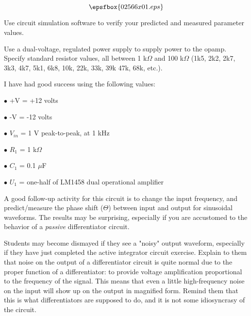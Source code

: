 

$$\epsfbox{02566x01.eps}$$

\vfil \eject






Use circuit simulation software to verify your predicted and measured parameter values.







Use a dual-voltage, regulated power supply to supply power to the opamp.  Specify standard resistor values, all between 1 k$\Omega$ and 100 k$\Omega$ (1k5, 2k2, 2k7, 3k3, 4k7, 5k1, 6k8, 10k, 22k, 33k, 39k 47k, 68k, etc.).

I have had good success using the following values:

\medskip
\item{$\bullet$} +V = +12 volts
\item{$\bullet$} -V = -12 volts
\item{$\bullet$} $V_{in}$ = 1 V peak-to-peak, at 1 kHz
\item{$\bullet$} $R_1$ = 1 k$\Omega$
\item{$\bullet$} $C_1$ = 0.1 $\mu$F
\item{$\bullet$} $U_1$ = one-half of LM1458 dual operational amplifier
\medskip

A good follow-up activity for this circuit is to change the input frequency, and predict/measure the phase shift ($\Theta$) between input and output for sinusoidal waveforms.  The results may be surprising, especially if you are accustomed to the behavior of a {\it passive} differentiator circuit.

Students may become dismayed if they see a "noisy" output waveform, especially if they have just completed the active integrator circuit exercise.  Explain to them that noise on the output of a differentiator circuit is quite normal due to the proper function of a differentiator: to provide voltage amplification proportional to the frequency of the signal.  This means that even a little high-frequency noise on the input will show up on the output in magnified form.  Remind them that this is what differentiators are supposed to do, and it is not some idiosyncrasy of the circuit.

